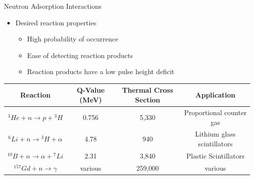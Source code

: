 \begin{frame}{Neutron Adsorption Interactions}
\begin{itemize}
	\item Desired reaction properties
	\begin{itemize}
		\item High probability of occurrence
		\item Ease of detecting reaction products
		\item Reaction products have a low pulse height deficit
	\end{itemize}
\end{itemize}
\begin{table}
	\tiny
	\begin{tabular}{ c | c c c} 
		Reaction                           & Q-Value (MeV) & Thermal Cross Section & Application \\
		\hline
		\hline
		${}^3He + n \to p +{}^3H$          & 0.756     & 5,330 & Proportional counter gas \\
		${}^6Li + n \to {}^3H + \alpha$    & 4.78      & 940 & Lithium glass scintillators \\
		${}^{10}B + n \to \alpha + {}^7Li$ & 2.31      & 3,840 & Plastic Scintillators \\
		${}^{157}Gd + n \to \gamma$        &various    & 259,000 & various \\
	\end{tabular}
\end{table}
\end{frame}

